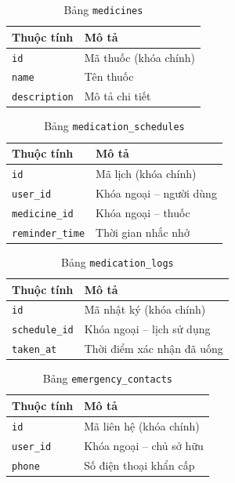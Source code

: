\documentclass[12pt,a4paper]{report}
\begin{document}
\begin{table}[h!]
  \centering
  \caption{Bảng \texttt{medicines}}
  \begin{tabular}{L{3.5cm} L{8cm}}
    \toprule
    
    \textbf{Thuộc tính} & \textbf{Mô tả} \\
    \midrule
    \texttt{id}          & Mã thuốc (khóa chính) \\
    \texttt{name}        & Tên thuốc \\
    \texttt{description} & Mô tả chi tiết \\
    \bottomrule
  \end{tabular}
\end{table}

\begin{table}[h!]
  \centering
  \caption{Bảng \texttt{medication\_schedules}}
  \begin{tabular}{L{3.5cm} L{8cm}}
    \toprule
    
    \textbf{Thuộc tính}  & \textbf{Mô tả} \\
    \midrule
    \texttt{id}            & Mã lịch (khóa chính) \\
    \texttt{user\_id}      & Khóa ngoại -- người dùng \\
    \texttt{medicine\_id}  & Khóa ngoại -- thuốc \\
    \texttt{reminder\_time}& Thời gian nhắc nhở \\
    \bottomrule
  \end{tabular}
\end{table}

\begin{table}[h!]
  \centering
  \caption{Bảng \texttt{medication\_logs}}
  \begin{tabular}{L{3.5cm} L{8cm}}
    \toprule
    
    \textbf{Thuộc tính} & \textbf{Mô tả} \\
    \midrule
    \texttt{id}           & Mã nhật ký (khóa chính) \\
    \texttt{schedule\_id} & Khóa ngoại -- lịch sử dụng \\
    \texttt{taken\_at}    & Thời điểm xác nhận đã uống \\
    \bottomrule
  \end{tabular}
\end{table}

\begin{table}[h!]
  \centering
  \caption{Bảng \texttt{emergency\_contacts}}
  \begin{tabular}{L{3.5cm} L{8cm}}
    \toprule
    
    \textbf{Thuộc tính} & \textbf{Mô tả} \\
    \midrule
    \texttt{id}       & Mã liên hệ (khóa chính) \\
    \texttt{user\_id} & Khóa ngoại -- chủ sở hữu \\
    \texttt{phone}    & Số điện thoại khẩn cấp \\
    \bottomrule
  \end{tabular}
\end{table}
\end{document}
